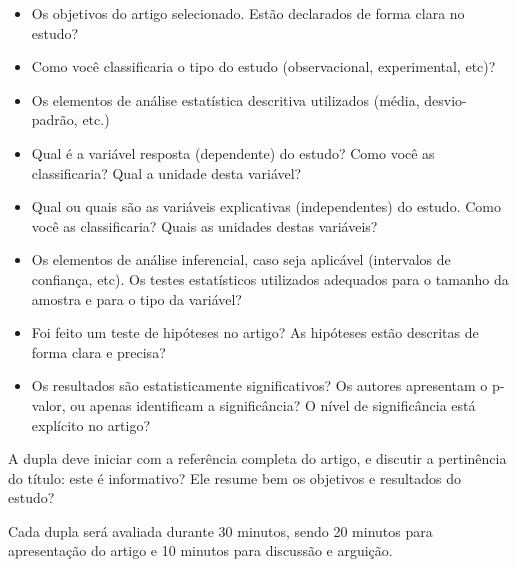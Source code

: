 \documentclass[a4paper]{article}
\begin{document}
\begin{itemize}
\item Os objetivos do artigo selecionado. Estão declarados de forma
  clara no estudo?
\item Como você classificaria o tipo do estudo (observacional,
  experimental, etc)?
\item Os elementos de análise estatística descritiva utilizados
  (média, desvio-padrão, etc.)
\item Qual é a variável resposta (dependente) do estudo? Como você as
  classificaria? Qual a unidade desta variável?
\item Qual ou quais são as variáveis explicativas (independentes) do
  estudo. Como você as classificaria? Quais as unidades destas
  variáveis?
\item Os elementos de análise inferencial, caso seja aplicável
  (intervalos de confiança, etc). Os testes estatísticos utilizados
  adequados para o tamanho da amostra e para o tipo da variável?
\item Foi feito um teste de hipóteses no artigo? As hipóteses estão
  descritas de forma clara e precisa?
\item Os resultados são estatisticamente significativos? Os autores
  apresentam o p-valor, ou apenas identificam a significância? O nível
  de significância está explícito no artigo?
\end{itemize}

A dupla deve iniciar com a referência completa do artigo, e discutir a
pertinência do título: este é informativo? Ele resume bem os objetivos
e resultados do estudo?

Cada dupla será avaliada durante 30 minutos, sendo 20 minutos para
apresentação do artigo e 10 minutos para discussão e arguição.
\end{document}
